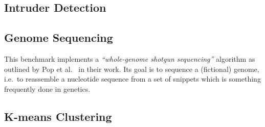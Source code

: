 \subsection{Intruder Detection}

\subsection{Genome Sequencing}
This benchmark implements a \emph{\enquote{whole-genome shotgun sequencing}} algorithm as outlined by Pop et al.~\cite{pop2002genome} in their work.
Its goal is to sequence a (fictional) genome, i.e.\ to reassemble a nucleotide sequence from a set of snippets which is something frequently done in genetics.


\subsection{K-means Clustering}







